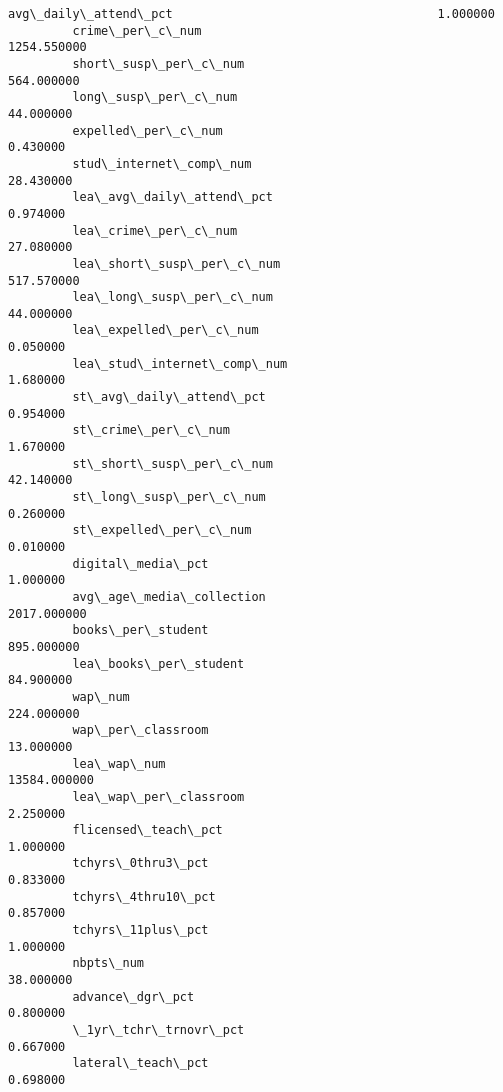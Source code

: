 \documentclass[11pt]{article}
\begin{document}
\begin{Verbatim}[commandchars=\\\{\}]
         avg\_daily\_attend\_pct                                     1.000000  
         crime\_per\_c\_num                                       1254.550000  
         short\_susp\_per\_c\_num                                   564.000000  
         long\_susp\_per\_c\_num                                     44.000000  
         expelled\_per\_c\_num                                       0.430000  
         stud\_internet\_comp\_num                                  28.430000  
         lea\_avg\_daily\_attend\_pct                                 0.974000  
         lea\_crime\_per\_c\_num                                     27.080000  
         lea\_short\_susp\_per\_c\_num                               517.570000  
         lea\_long\_susp\_per\_c\_num                                 44.000000  
         lea\_expelled\_per\_c\_num                                   0.050000  
         lea\_stud\_internet\_comp\_num                               1.680000  
         st\_avg\_daily\_attend\_pct                                  0.954000  
         st\_crime\_per\_c\_num                                       1.670000  
         st\_short\_susp\_per\_c\_num                                 42.140000  
         st\_long\_susp\_per\_c\_num                                   0.260000  
         st\_expelled\_per\_c\_num                                    0.010000  
         digital\_media\_pct                                        1.000000  
         avg\_age\_media\_collection                              2017.000000  
         books\_per\_student                                      895.000000  
         lea\_books\_per\_student                                   84.900000  
         wap\_num                                                224.000000  
         wap\_per\_classroom                                       13.000000  
         lea\_wap\_num                                          13584.000000  
         lea\_wap\_per\_classroom                                    2.250000  
         flicensed\_teach\_pct                                      1.000000  
         tchyrs\_0thru3\_pct                                        0.833000  
         tchyrs\_4thru10\_pct                                       0.857000  
         tchyrs\_11plus\_pct                                        1.000000  
         nbpts\_num                                               38.000000  
         advance\_dgr\_pct                                          0.800000  
         \_1yr\_tchr\_trnovr\_pct                                     0.667000  
         lateral\_teach\_pct                                        0.698000  

\end{Verbatim}
\end{document}
